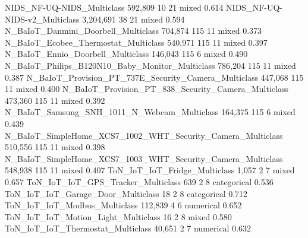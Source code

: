 NIDS_NF-UQ-NIDS_Multiclass                                              592,809       10      21         mixed   0.614
NIDS_NF-UQ-NIDS-v2_Multiclass                                         3,204,691       38      21         mixed   0.594
N_BaIoT_Danmini_Doorbell_Multiclass                                     704,874      115      11         mixed   0.373
N_BaIoT_Ecobee_Thermostat_Multiclass                                    540,971      115      11         mixed   0.397
N_BaIoT_Ennio_Doorbell_Multiclass                                       146,043      115       6         mixed   0.490
N_BaIoT_Philips_B120N10_Baby_Monitor_Multiclass                         786,204      115      11         mixed   0.387
N_BaIoT_Provision_PT_737E_Security_Camera_Multiclass                    447,068      115      11         mixed   0.400
N_BaIoT_Provision_PT_838_Security_Camera_Multiclass                     473,360      115      11         mixed   0.392
N_BaIoT_Samsung_SNH_1011_N_Webcam_Multiclass                            164,375      115       6         mixed   0.439
N_BaIoT_SimpleHome_XCS7_1002_WHT_Security_Camera_Multiclass             510,556      115      11         mixed   0.398
N_BaIoT_SimpleHome_XCS7_1003_WHT_Security_Camera_Multiclass             548,938      115      11         mixed   0.407
ToN_IoT_IoT_Fridge_Multiclass                                             1,057        2       7         mixed   0.657
ToN_IoT_IoT_GPS_Tracker_Multiclass                                          639        2       8   categorical   0.536
ToN_IoT_IoT_Garage_Door_Multiclass                                           18        2       8   categorical   0.712
ToN_IoT_IoT_Modbus_Multiclass                                           112,839        4       6     numerical   0.652
ToN_IoT_IoT_Motion_Light_Multiclass                                          16        2       8         mixed   0.580
ToN_IoT_IoT_Thermostat_Multiclass                                        40,651        2       7     numerical   0.632
